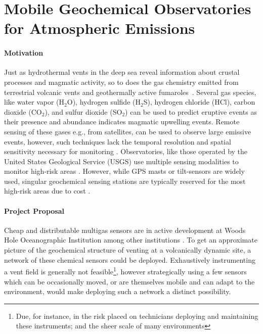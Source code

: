 \section{Mobile Geochemical Observatories for Atmospheric Emissions}
\paragraph{Motivation}
Just as hydrothermal vents in the deep sea reveal information about crustal processes and magmatic activity, so to does the gas chemistry emitted from terrestrial volcanic vents and geothermally active fumaroles~\autocite{mcgonigle2008unmanned,smith2009volcano,fischer2015temporal}.
Several gas species, like water vapor (H$_2$O), hydrogen sulfide (H$_2$S), hydrogen chloride (HCl), carbon dioxide (CO$_2$), and sulfur dioxide (SO$_2$) can be used to predict eruptive events \autocite{smith2009volcano,fischer2015temporal,fischer2019explosions,hernandez2001carbon} as their presence and abundance indicates magmatic upwelling events.
Remote sensing of these gases e.g., from satellites, can be used to observe large emissive events, however, such techniques lack the temporal resolution and spatial sensitivity necessary for monitoring \autocite{mcgonigle2008unmanned}.
Observatories, like those operated by the United States Geological Service (USGS) use multiple sensing modalities to monitor high-risk areas \autocite{usgs2019}.
However, while GPS masts or tilt-sensors are widely used, singular geochemical sensing stations are typically reserved for the most high-risk areas due to cost \autocite{smith2009volcano}.

\paragraph{Project Proposal}
Cheap and distributable multigas sensors are in active development at Woods Hole Oceanographic Institution among other institutions \autocite{kaliszewski2021multi,stix2018using,galle2021multi}.
To get an approximate picture of the geochemical structure of venting at a volcanically dynamic site, a network of these chemical sensors could be deployed. Exhaustively instrumenting a vent field is generally not feasible\footnote{Due, for instance, in the risk placed on technicians deploying and maintaining these instruments; and the sheer scale of many environments}, however strategically using a few sensors which can be occasionally moved, or are themselves mobile and can adapt to the environment, would make deploying such a network a distinct possibility.

